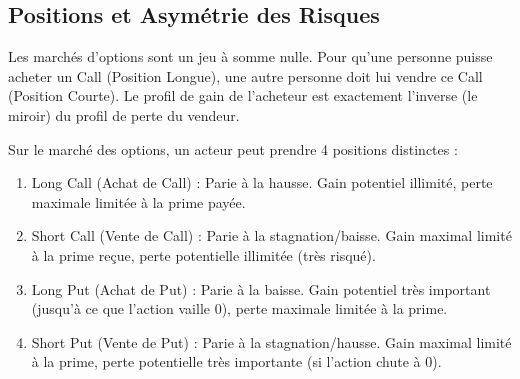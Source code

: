 \vspace{0.5cm}
\begin{center}
\end{center}
\vspace{0.5cm}

\subsection{Positions et Asymétrie des Risques}

Les marchés d'options sont un jeu à somme nulle. Pour qu'une personne puisse acheter un Call (Position Longue), une autre personne doit lui vendre ce Call (Position Courte). Le profil de gain de l'acheteur est exactement l'inverse (le miroir) du profil de perte du vendeur.

\begin{definitionbox}
Sur le marché des options, un acteur peut prendre 4 positions distinctes :
\begin{enumerate}
    \item Long Call (Achat de Call) : Parie à la hausse. Gain potentiel illimité, perte maximale limitée à la prime payée.
    \item Short Call (Vente de Call) : Parie à la stagnation/baisse. Gain maximal limité à la prime reçue, perte potentielle illimitée (très risqué).
    \item Long Put (Achat de Put) : Parie à la baisse. Gain potentiel très important (jusqu'à ce que l'action vaille 0), perte maximale limitée à la prime.
    \item Short Put (Vente de Put) : Parie à la stagnation/hausse. Gain maximal limité à la prime, perte potentielle très importante (si l'action chute à 0).
\end{enumerate}
\end{definitionbox}

